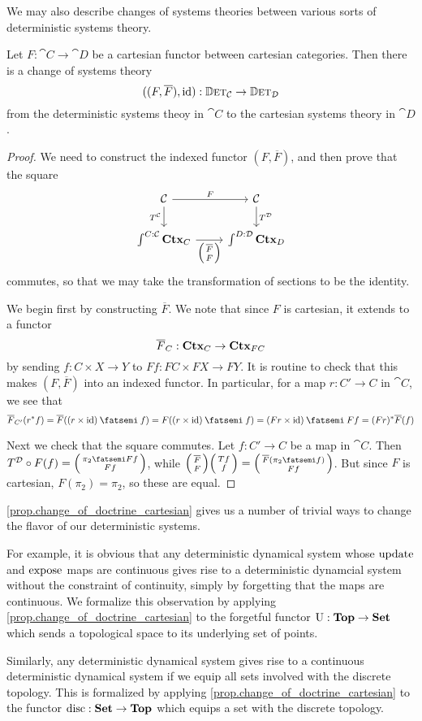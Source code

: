 \documentclass[DynamicalBook]{subfiles}
\begin{document}
We may also describe changes of systems theories between various sorts of deterministic
systems theory.
\begin{proposition}\label{prop.change_of_doctrine_cartesian}
Let $F : \cat{C} \to \cat{D}$ be a cartesian functor between cartesian
categories. Then there is a change of systems theory
\[
((F, \overline{F}), \mathrm{id}) : \mathbb{D}\textsc{et}_{\mathcal{C}} \to \mathbb{D}\textsc{et}_{\mathcal{D}} 
\]
from the deterministic systems theoy in $\cat{C}$ to the cartesian systems theory in $\cat{D}$.
\end{proposition}
\begin{proof}
We need to construct the indexed functor $(F, \overline{F})$, and then prove
that the square 
\[
  \begin{tikzcd}
\cat{C} \ar[r, "F"]\ar[d,"T^{\cat{C}}"'] & \cat{C}  \ar[d,"T^{\cat{D}}"]\\
  \int^{C : \cat{C}}\smctx{C} \ar[r, "{\littlelens{\overline{F}}{F}}"']  & \int^{D : \cat{D}}
  \smctx{D}  
  \end{tikzcd}
\]
commutes, so that we may take the transformation of sections to be the identity.

We begin first by constructing $\overline{F}$. We note that since $F$ is
cartesian, it extends to a functor
$$\overline{F}_C : \textbf{Ctx}_{C} \to \textbf{Ctx}_{FC}$$
by sending $f : C \times X \to Y$ to $Ff : FC \times FX \to FY$. It is routine
to check that this makes $(F, \overline{F})$ into an indexed functor. In
particular, for a map
$r : C' \to C$ in $\cat{C}$, we see that
\[
\overline{F}_{C'}(r^{\ast}f) = \overline{F}((r \times \id) \then f) = F((r
\times \id) \then f) = (Fr \times \id) \then Ff = (Fr)^{\ast}\overline{F}(f)
\]

Next we check that the square commutes. Let $f : C' \to C$ be a map in
$\cat{C}$. Then $T^{\cat{D}} \circ F (f) = \lens{\pi_2 \then Ff}{Ff}$, while
$\lens{\overline{F}}{F}\lens{Tf}{f} = \lens{\overline{F}(\pi_2 \then f)}{Ff}$.
But since $F$ is cartesian, $F(\pi_2) = \pi_2$, so these are equal.
\end{proof}

\begin{example}
  \cref{prop.change_of_doctrine_cartesian} gives us a number of trivial ways to
  change the flavor of our deterministic systems.

For example, it is obvious that any deterministic dynamical system whose
$\mathrm{update}_{\mathsf{}}$ and $\mathrm{expose}_{\mathsf{}}$ maps are continuous gives rise to a deterministic
dynamcial system without the constraint of continuity, simply by forgetting that
the maps are continuous. We formalize this observation by applying
\cref{prop.change_of_doctrine_cartesian} to the forgetful functor $\mathrm{U} : \textbf{Top}
\to \textbf{Set}$ which sends a topological space to its underlying set of points.

Similarly, any deterministic dynamical system gives rise to a continuous
deterministic dynamical system if we equip all sets involved with the discrete
topology. This is formalized by applying
\cref{prop.change_of_doctrine_cartesian} to the functor $\mathrm{disc} : \textbf{Set} \to
\textbf{Top}$ which equips a set with the discrete topology.
\end{example}
\end{document}
